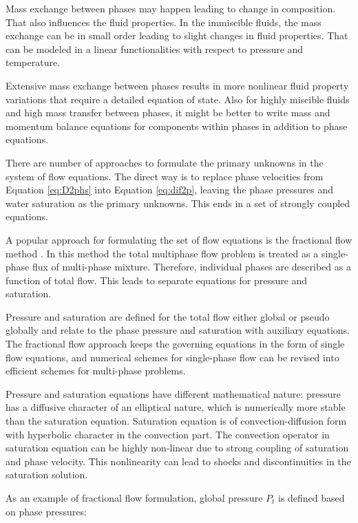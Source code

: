 Mass exchange between phases may happen leading to change in composition. That
also influences the fluid properties. In the immiscible fluids, the mass
exchange can be in small
order leading to slight changes in fluid properties. That can be modeled in a
linear functionalities with respect to pressure and temperature. 
 
Extensive mass exchange between phases results in more nonlinear fluid property
variations that require a detailed equation of state. Also for highly miscible
fluids and high mass transfer between phases, it might be better to write mass
and momentum balance equations for components within phases in addition to phase
equations.
 
There are number of approaches to formulate the primary unknowns in the system
of
flow equations. The direct way is to replace phase velocities from Equation
\ref{eq:D2phs} into Equation \ref{eq:dif2p}, leaving the phase pressures and
water saturation as the primary unknowns. This ends in a set of strongly coupled
equations. 
 
A popular approach for formulating the set of flow equations is the fractional
flow method \cite{binning1999practical}. In this method the total multiphase
flow problem is treated as a
single-phase flux of multi-phase mixture. Therefore, individual phases are
described as a function of total flow. This leads to separate equations for
pressure and saturation. 
 
Pressure and saturation are defined for the total flow either global or pseudo
globally and relate to the phase pressure and saturation with auxiliary
equations. The fractional flow approach keeps the governing equations in the
form of single flow equations, and numerical schemes for single-phase flow can
be revised into efficient schemes for multi-phase problems.
 
Pressure and saturation equations have different mathematical nature: pressure
has a diffusive character of an elliptical nature, which is numerically more
stable than the saturation equation. Saturation equation is of
convection-diffusion form with hyperbolic character in the convection part. The
convection operator in saturation equation can be highly non-linear due to
strong coupling of saturation and phase velocity. This nonlinearity can lead to
shocks and discontinuities in the saturation solution.
 
As an example of fractional flow formulation, global pressure $P_t$ is defined
based on phase pressures:
 
